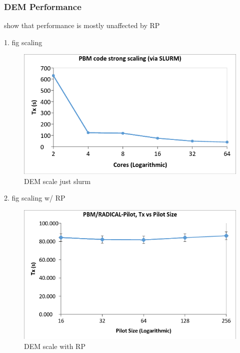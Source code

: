 \documentclass[preprint,11pt,authoryear]{elsarticle}
\begin{document}
	      
	    \subsubsection{DEM Performance}
	    \par show that performance is mostly unaffected by RP 
	    \par 1. fig scaling 
	      \begin{figure}[H]
	      \centering
	      \includegraphics[scale=0.5]{rslts_strong_scale_slurm}
	      \caption{ DEM scale just slurm }
	      \label{fig:rslts_DEM_strong_scale}
	      \end{figure}
	    \par 2. fig scaling w/ RP  
	      \begin{figure}[H]
	      \centering
	      \includegraphics[scale=0.5]{rslts_pbmbyrp_strng}
	      \caption{ DEM scale with RP}
	      \label{fig:rslts_dembyRP_strng}
	      \end{figure}
	      
	 
\end{document}
